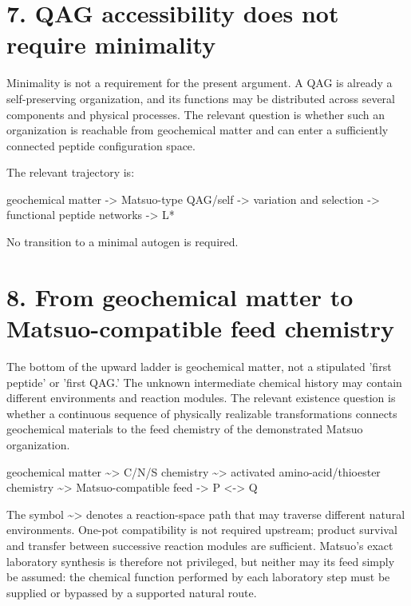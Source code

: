 \documentclass[11pt]{article}
\begin{document}
\hypertarget{qag-accessibility-does-not-require-minimality}{%
\section*{7. QAG accessibility does not require minimality}\label{qag-accessibility-does-not-require-minimality}}

Minimality is not a requirement for the present argument. A QAG is already a self-preserving organization, and its functions may be distributed across several components and physical processes. The relevant question is whether such an organization is reachable from geochemical matter and can enter a sufficiently connected peptide configuration space.

The relevant trajectory is:

geochemical matter -\textgreater{} Matsuo-type QAG/self -\textgreater{} variation and selection -\textgreater{} functional peptide networks -\textgreater{} L*

No transition to a minimal autogen is required.

\hypertarget{from-geochemical-matter-to-matsuo-compatible-feed-chemistry}{%
\section*{8. From geochemical matter to Matsuo-compatible feed chemistry}\label{from-geochemical-matter-to-matsuo-compatible-feed-chemistry}}

The bottom of the upward ladder is geochemical matter, not a stipulated 'first peptide' or 'first QAG.' The unknown intermediate chemical history may contain different environments and reaction modules. The relevant existence question is whether a continuous sequence of physically realizable transformations connects geochemical materials to the feed chemistry of the demonstrated Matsuo organization.

geochemical matter \textasciitilde\textgreater{} C/N/S chemistry \textasciitilde\textgreater{} activated amino-acid/thioester chemistry \textasciitilde\textgreater{} Matsuo-compatible feed -\textgreater{} P \textless-\textgreater{} Q

The symbol \textasciitilde\textgreater{} denotes a reaction-space path that may traverse different natural environments. One-pot compatibility is not required upstream; product survival and transfer between successive reaction modules are sufficient. Matsuo's exact laboratory synthesis is therefore not privileged, but neither may its feed simply be assumed: the chemical function performed by each laboratory step must be supplied or bypassed by a supported natural route.
\end{document}
